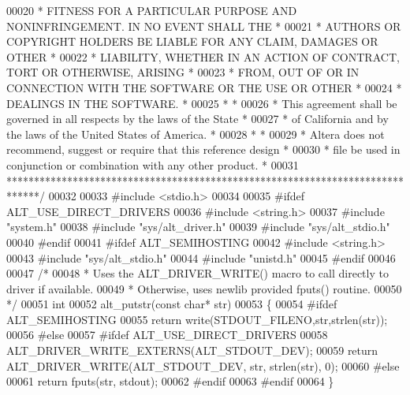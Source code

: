 \begin{DoxyCode}
00020 \textcolor{comment}{* FITNESS FOR A PARTICULAR PURPOSE AND NONINFRINGEMENT. IN NO EVENT SHALL THE *}
00021 \textcolor{comment}{* AUTHORS OR COPYRIGHT HOLDERS BE LIABLE FOR ANY CLAIM, DAMAGES OR OTHER      *}
00022 \textcolor{comment}{* LIABILITY, WHETHER IN AN ACTION OF CONTRACT, TORT OR OTHERWISE, ARISING     *}
00023 \textcolor{comment}{* FROM, OUT OF OR IN CONNECTION WITH THE SOFTWARE OR THE USE OR OTHER         *}
00024 \textcolor{comment}{* DEALINGS IN THE SOFTWARE.                                                   *}
00025 \textcolor{comment}{*                                                                             *}
00026 \textcolor{comment}{* This agreement shall be governed in all respects by the laws of the State   *}
00027 \textcolor{comment}{* of California and by the laws of the United States of America.              *}
00028 \textcolor{comment}{*                                                                             *}
00029 \textcolor{comment}{* Altera does not recommend, suggest or require that this reference design    *}
00030 \textcolor{comment}{* file be used in conjunction or combination with any other product.          *}
00031 \textcolor{comment}{******************************************************************************/}
00032 
00033 \textcolor{preprocessor}{#include <stdio.h>}
00034 
00035 \textcolor{preprocessor}{#ifdef ALT\_USE\_DIRECT\_DRIVERS}
00036 \textcolor{preprocessor}{#include <string.h>}
00037 \textcolor{preprocessor}{#include "system.h"}
00038 \textcolor{preprocessor}{#include "sys/alt_driver.h"}
00039 \textcolor{preprocessor}{#include "sys/alt_stdio.h"}
00040 \textcolor{preprocessor}{#endif}
00041 \textcolor{preprocessor}{#ifdef ALT\_SEMIHOSTING}
00042 \textcolor{preprocessor}{#include <string.h>}
00043 \textcolor{preprocessor}{#include "sys/alt_stdio.h"}
00044 \textcolor{preprocessor}{#include "unistd.h"}
00045 \textcolor{preprocessor}{#endif}
00046 
00047 \textcolor{comment}{/*}
00048 \textcolor{comment}{ * Uses the ALT\_DRIVER\_WRITE() macro to call directly to driver if available.}
00049 \textcolor{comment}{ * Otherwise, uses newlib provided fputs() routine.}
00050 \textcolor{comment}{ */}
00051 \textcolor{keywordtype}{int} 
00052 alt_putstr(\textcolor{keyword}{const} \textcolor{keywordtype}{char}* str)
00053 \{
00054 \textcolor{preprocessor}{#ifdef ALT\_SEMIHOSTING}
00055     \textcolor{keywordflow}{return} write(STDOUT\_FILENO,str,strlen(str));
00056 \textcolor{preprocessor}{#else}
00057 \textcolor{preprocessor}{#ifdef ALT\_USE\_DIRECT\_DRIVERS}
00058     ALT_DRIVER_WRITE_EXTERNS(ALT_STDOUT_DEV);
00059     \textcolor{keywordflow}{return} ALT_DRIVER_WRITE(ALT_STDOUT_DEV, str, strlen(str), 0);
00060 \textcolor{preprocessor}{#else}
00061     \textcolor{keywordflow}{return} fputs(str, stdout);
00062 \textcolor{preprocessor}{#endif}
00063 \textcolor{preprocessor}{#endif}
00064 \}
\end{DoxyCode}

